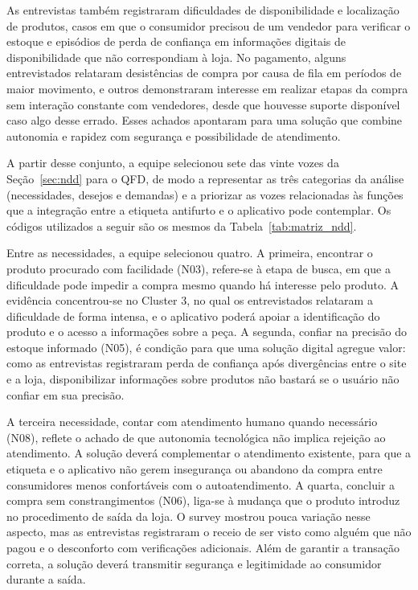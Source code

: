 As entrevistas também registraram dificuldades de disponibilidade e localização de produtos, casos em que o consumidor precisou de um vendedor para verificar o estoque e episódios de perda de confiança em informações digitais de disponibilidade que não correspondiam à loja. No pagamento, alguns entrevistados relataram desistências de compra por causa de fila em períodos de maior movimento, e outros demonstraram interesse em realizar etapas da compra sem interação constante com vendedores, desde que houvesse suporte disponível caso algo desse errado. Esses achados apontaram para uma solução que combine autonomia e rapidez com segurança e possibilidade de atendimento.

A partir desse conjunto, a equipe selecionou sete das vinte vozes da Seção~\ref{sec:ndd} para o QFD, de modo a representar as três categorias da análise (necessidades, desejos e demandas) e a priorizar as vozes relacionadas às funções que a integração entre a etiqueta antifurto e o aplicativo pode contemplar. Os códigos utilizados a seguir são os mesmos da Tabela~\ref{tab:matriz_ndd}.

Entre as necessidades, a equipe selecionou quatro. A primeira, encontrar o produto procurado com facilidade (N03), refere-se à etapa de busca, em que a dificuldade pode impedir a compra mesmo quando há interesse pelo produto. A evidência concentrou-se no Cluster 3, no qual os entrevistados relataram a dificuldade de forma intensa, e o aplicativo poderá apoiar a identificação do produto e o acesso a informações sobre a peça. A segunda, confiar na precisão do estoque informado (N05), é condição para que uma solução digital agregue valor: como as entrevistas registraram perda de confiança após divergências entre o site e a loja, disponibilizar informações sobre produtos não bastará se o usuário não confiar em sua precisão.

A terceira necessidade, contar com atendimento humano quando necessário (N08), reflete o achado de que autonomia tecnológica não implica rejeição ao atendimento. A solução deverá complementar o atendimento existente, para que a etiqueta e o aplicativo não gerem insegurança ou abandono da compra entre consumidores menos confortáveis com o autoatendimento. A quarta, concluir a compra sem constrangimentos (N06), liga-se à mudança que o produto introduz no procedimento de saída da loja. O survey mostrou pouca variação nesse aspecto, mas as entrevistas registraram o receio de ser visto como alguém que não pagou e o desconforto com verificações adicionais. Além de garantir a transação correta, a solução deverá transmitir segurança e legitimidade ao consumidor durante a saída.

